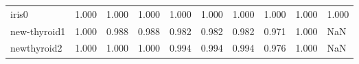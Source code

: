 \begin{tabular}{llllllllll}
iris0                  &                        \makecell{1.000 \\ \scriptsize{}} &                  \makecell{1.000 \\ \scriptsize{}} &            \makecell{1.000 \\ \scriptsize{}} &               \makecell{1.000 \\ \scriptsize{}} &            \makecell{1.000 \\ \scriptsize{}} &         \makecell{1.000 \\ \scriptsize{}} &                        \makecell{1.000 \\ \scriptsize{}} &                     \makecell{1.000 \\ \scriptsize{}} &                  \makecell{1.000 \\ \scriptsize{}} \\
new-thyroid1           &                        \makecell{1.000 \\ \scriptsize{}} &                  \makecell{0.988 \\ \scriptsize{}} &            \makecell{0.988 \\ \scriptsize{}} &               \makecell{0.982 \\ \scriptsize{}} &            \makecell{0.982 \\ \scriptsize{}} &         \makecell{0.982 \\ \scriptsize{}} &                        \makecell{0.971 \\ \scriptsize{}} &                     \makecell{1.000 \\ \scriptsize{}} &                                                NaN \\
newthyroid2            &                        \makecell{1.000 \\ \scriptsize{}} &                  \makecell{1.000 \\ \scriptsize{}} &            \makecell{1.000 \\ \scriptsize{}} &               \makecell{0.994 \\ \scriptsize{}} &            \makecell{0.994 \\ \scriptsize{}} &         \makecell{0.994 \\ \scriptsize{}} &                        \makecell{0.976 \\ \scriptsize{}} &                     \makecell{1.000 \\ \scriptsize{}} &                                                NaN \\

\end{tabular}
